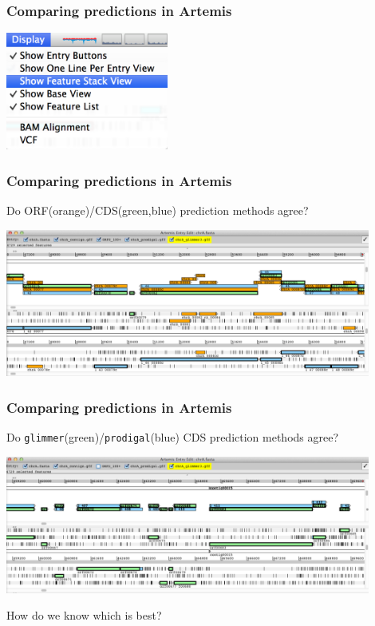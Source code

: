 \documentclass[table]{beamer}
\begin{document}
    \begin{frame}
     \frametitle{Comparing predictions in Artemis}
      \begin{center}
        \includegraphics[width=0.4\textwidth]{images/artemis_cdspred2}     
      \end{center}
    \end{frame}  

    \begin{frame}
     \frametitle{Comparing predictions in Artemis}
     Do ORF(orange)/CDS(green,blue) prediction methods agree?
      \begin{center}
        \includegraphics[width=0.9\textwidth]{images/artemis_cdspred3}     
      \end{center}
    \end{frame}  

    \begin{frame}
     \frametitle{Comparing predictions in Artemis}
     Do \texttt{glimmer}(green)/\texttt{prodigal}(blue) CDS prediction methods agree?
      \begin{center}
        \includegraphics[width=0.9\textwidth]{images/artemis_cdspred4}     
      \end{center}
      How do we know which is best?
    \end{frame}  
\end{document}
